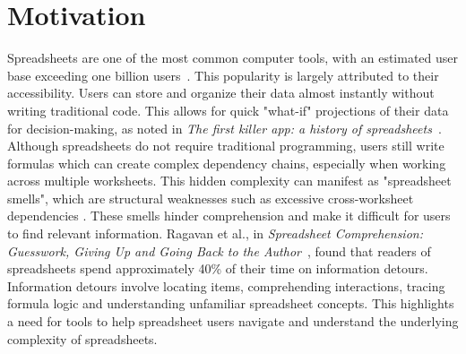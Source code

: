 \section{Motivation}
Spreadsheets are one of the most common computer tools, with an estimated user base exceeding one billion users~\cite{gislason_excel_2021}. This popularity is largely attributed to their accessibility. Users can store and organize their data almost instantly without writing traditional code. This allows for quick "what-if" projections of their data for decision-making, as noted in \textit{The first killer app: a history of spreadsheets}~\cite{zynda_first_2013}.
Although spreadsheets do not require traditional programming, users still write formulas which can create complex dependency chains, especially when working across multiple worksheets. This hidden complexity can manifest as "spreadsheet smells", which are structural weaknesses such as excessive cross-worksheet dependencies \cite{hermans_detecting_2012}. These smells hinder comprehension and make it difficult for users to find relevant information. Ragavan et al., in \textit{Spreadsheet Comprehension: Guesswork, Giving Up and Going Back to the Author}~\cite{srinivasa_ragavan_spreadsheet_2021}, found that readers of spreadsheets spend approximately 40\% of their time on information detours. Information detours involve locating items, comprehending interactions, tracing formula logic and understanding unfamiliar spreadsheet concepts. This highlights a need for tools to help spreadsheet users navigate and understand the underlying complexity of spreadsheets.






